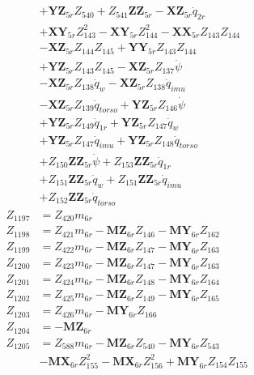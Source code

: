 \begin{multicols}{2}
\begin{align}
&+ \mathbf{YZ}_{5r}Z_{540} + Z_{541}\mathbf{ZZ}_{5r} - \mathbf{XZ}_{5r}\dot{q}_{2r}  \nonumber \\
&+ \mathbf{XY}_{5r}Z_{143}^2 - \mathbf{XY}_{5r}Z_{144}^2 - \mathbf{XX}_{5r}Z_{143}Z_{144}  \nonumber \\
&- \mathbf{XZ}_{5r}Z_{144}Z_{145} + \mathbf{YY}_{5r}Z_{143}Z_{144}  \nonumber \\
&+ \mathbf{YZ}_{5r}Z_{143}Z_{145} - \mathbf{XZ}_{5r}Z_{137}\dot{\psi}  \nonumber \\
&- \mathbf{XZ}_{5r}Z_{138}\dot{q}_{w} - \mathbf{XZ}_{5r}Z_{138}\dot{q}_{imu}  \nonumber \\
&- \mathbf{XZ}_{5r}Z_{139}\dot{q}_{torso} + \mathbf{YZ}_{5r}Z_{146}\dot{\psi}  \nonumber \\
&+ \mathbf{YZ}_{5r}Z_{149}\dot{q}_{1r} + \mathbf{YZ}_{5r}Z_{147}\dot{q}_{w}  \nonumber \\
&+ \mathbf{YZ}_{5r}Z_{147}\dot{q}_{imu} + \mathbf{YZ}_{5r}Z_{148}\dot{q}_{torso}  \nonumber \\
&+ Z_{150}\mathbf{ZZ}_{5r}\dot{\psi} + Z_{153}\mathbf{ZZ}_{5r}\dot{q}_{1r}  \nonumber \\
&+ Z_{151}\mathbf{ZZ}_{5r}\dot{q}_{w} + Z_{151}\mathbf{ZZ}_{5r}\dot{q}_{imu}  \nonumber \\
&+ Z_{152}\mathbf{ZZ}_{5r}\dot{q}_{torso} \nonumber \\
Z_{1197} &= Z_{420}m_{6r} \nonumber \\
Z_{1198} &= Z_{421}m_{6r} - \mathbf{MZ}_{6r}Z_{146} - \mathbf{MY}_{6r}Z_{162} \nonumber \\
Z_{1199} &= Z_{422}m_{6r} - \mathbf{MZ}_{6r}Z_{147} - \mathbf{MY}_{6r}Z_{163} \nonumber \\
Z_{1200} &= Z_{423}m_{6r} - \mathbf{MZ}_{6r}Z_{147} - \mathbf{MY}_{6r}Z_{163} \nonumber \\
Z_{1201} &= Z_{424}m_{6r} - \mathbf{MZ}_{6r}Z_{148} - \mathbf{MY}_{6r}Z_{164} \nonumber \\
Z_{1202} &= Z_{425}m_{6r} - \mathbf{MZ}_{6r}Z_{149} - \mathbf{MY}_{6r}Z_{165} \nonumber \\
Z_{1203} &= Z_{426}m_{6r} - \mathbf{MY}_{6r}Z_{166} \nonumber \\
Z_{1204} &= -\mathbf{MZ}_{6r} \nonumber \\
Z_{1205} &= Z_{588}m_{6r} - \mathbf{MZ}_{6r}Z_{540} - \mathbf{MY}_{6r}Z_{543}  \nonumber \\
&- \mathbf{MX}_{6r}Z_{155}^2 - \mathbf{MX}_{6r}Z_{156}^2 + \mathbf{MY}_{6r}Z_{154}Z_{155}  \nonumber \\

\end{align}
\end{multicols}

